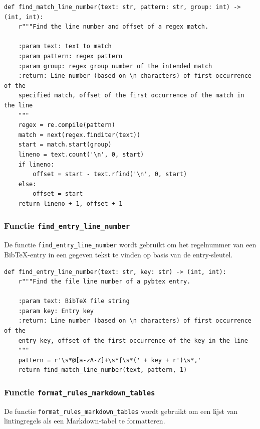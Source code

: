 \begin{verbatim}
def find_match_line_number(text: str, pattern: str, group: int) -> (int, int):
    r"""Find the line number and offset of a regex match.

    :param text: text to match
    :param pattern: regex pattern
    :param group: regex group number of the intended match
    :return: Line number (based on \n characters) of first occurrence of the
    specified match, offset of the first occurrence of the match in the line
    """
    regex = re.compile(pattern)
    match = next(regex.finditer(text))
    start = match.start(group)
    lineno = text.count('\n', 0, start)
    if lineno:
        offset = start - text.rfind('\n', 0, start)
    else:
        offset = start
    return lineno + 1, offset + 1
\end{verbatim}

\subsubsection{Functie \texttt{find\_entry\_line\_number}}

De functie \texttt{find\_entry\_line\_number} wordt gebruikt om het regelnummer van een BibTeX-entry in een gegeven tekst te vinden op basis van de entry-sleutel.

\begin{verbatim}
def find_entry_line_number(text: str, key: str) -> (int, int):
    r"""Find the file line number of a pybtex entry.

    :param text: BibTeX file string
    :param key: Entry key
    :return: Line number (based on \n characters) of first occurrence of the
    entry key, offset of the first occurrence of the key in the line
    """
    pattern = r'\s*@[a-zA-Z]+\s*{\s*(' + key + r')\s*,'
    return find_match_line_number(text, pattern, 1)
\end{verbatim}

\subsubsection{Functie \texttt{format\_rules\_markdown\_tables}}

De functie \texttt{format\_rules\_markdown\_tables} wordt gebruikt om een lijst van lintingregels als een Markdown-tabel te formatteren.

